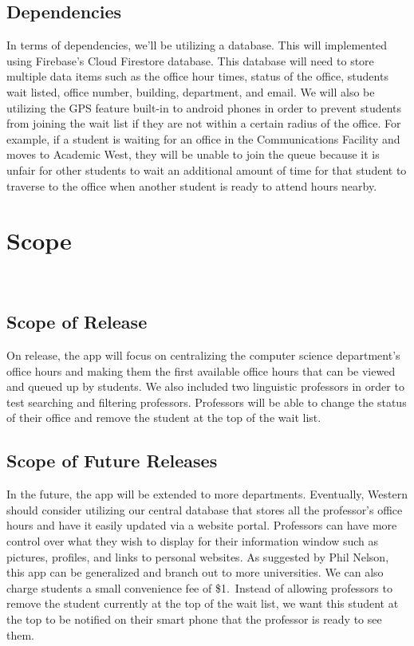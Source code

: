 \documentclass[11pt]{article} %
\begin{document}
\pagebreak 

\subsection{Dependencies}
In terms of dependencies, we'll be utilizing a database. This will implemented using Firebase's Cloud Firestore database. This database will need to store multiple data items such as the office hour times, status of the office, students wait listed, office number, building, department, and email. We will also be utilizing the GPS feature built-in to android phones in order to prevent students from joining the wait list if they are not within a certain radius of the office. For example, if a student is waiting for an office in the Communications Facility and moves to Academic West, they will be unable to join the queue because it is unfair for other students to wait an additional amount of time for that student to traverse to the office when another student is ready to attend hours nearby. 

\section{Scope}

\\
\subsection{Scope of Release}
On release, the app will focus on centralizing the computer science department's office hours and making them the first available office hours that can be viewed and queued up by students. We also included two linguistic professors in order to test searching and filtering professors. Professors will be able to change the status of their office and remove the student at the top of the wait list.

\subsection{Scope of Future Releases}
In the future, the app will be extended to more departments. Eventually, Western should consider utilizing our central database that stores all the professor's office hours and have it easily updated via a website portal. Professors can have more control over what they wish to display for their information window such as pictures, profiles, and links to personal websites. As suggested by Phil Nelson, this app can be generalized and branch out to more universities. We can also charge students a small convenience fee of \$1.\ Instead of allowing professors to remove the student currently at the top of the wait list, we want this student at the top to be notified on their smart phone that the professor is ready to see them.
\end{document}
